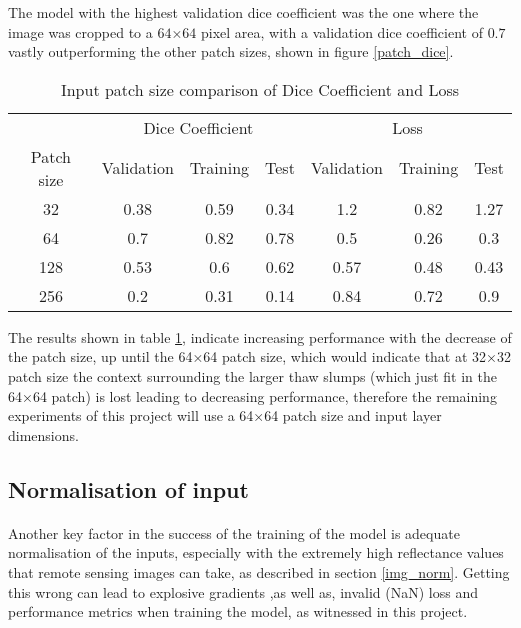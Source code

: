 The model with the highest validation dice coefficient was the one where the image was cropped to a $64$×$64$ pixel area, with a validation dice coefficient of $0.7$ vastly outperforming the other patch sizes, shown in figure \ref{patch_dice}.
\begin{table}[ht!] 
    \begin{center}
    \begin{tabular}{ccccccc} 
    \toprule
       & \multicolumn{3}{c}{Dice Coefficient} & \multicolumn{3}{c}{Loss} \\
    Patch size & Validation & Training & Test & Validation & Training & Test \\ \midrule
32 & 0.38 & 0.59 & 0.34 & 1.2 & 0.82 & 1.27 \\ \rowcolor{lightgray} 64 & 0.7 & 0.82 & 0.78 & 0.5 & 0.26 & 0.3  \\ 128 & 0.53 & 0.6 & 0.62 & 0.57 & 0.48 & 0.43  \\ 256 & 0.2 & 0.31 & 0.14 & 0.84 & 0.72 & 0.9  \\
\bottomrule
    \end{tabular}
  \end{center} 
  \caption{Input patch size comparison of Dice Coefficient and Loss}\label{tab_patch}
\end{table}

The results shown in table \ref{tab_patch}, indicate increasing performance with the decrease of the patch size, up until the 64×64 patch size, which would indicate that at 32×32 patch size the context surrounding the larger thaw slumps (which just fit in the 64×64 patch) is lost leading to decreasing performance, therefore the remaining experiments of this project will use a 64×64 patch size and input layer dimensions.
\subsection{Normalisation of input}
\paragraph{}
Another key factor in the success of the training of the model is adequate normalisation of the inputs, especially with the extremely high reflectance values that remote sensing images can take, as described in section \ref{img_norm}. Getting this wrong can lead to explosive gradients ,as well as, invalid (NaN) loss and performance metrics when training the model, as witnessed in this project.

